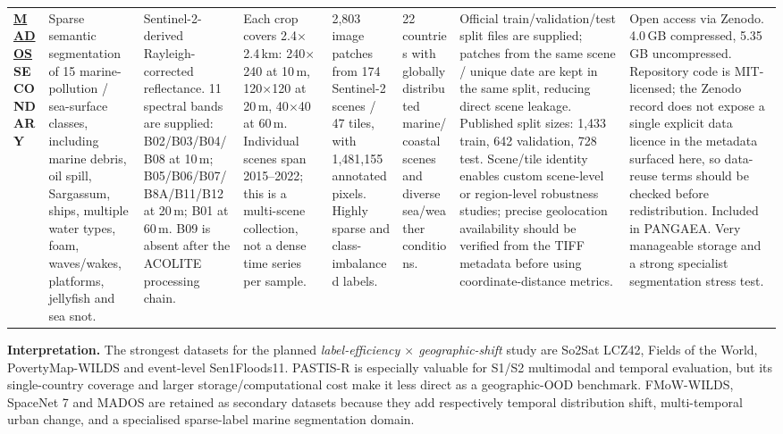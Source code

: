 \documentclass[11pt,a4paper]{article}
\begin{document}
\begin{landscape}
\begin{longtable}{
    Q{1.8cm}
    Q{2.5cm}
    Q{3.0cm}
    Q{2.5cm}
    Q{2.1cm}
    Q{3.0cm}
    Q{3.4cm}
    Q{3.4cm}
}
\href{https://zenodo.org/records/10664073}{\textbf{MADOS}}\newline
\textbf{SECONDARY}
&
Sparse semantic segmentation of 15 marine-pollution / sea-surface classes, including marine debris, oil spill, Sargassum, ships, multiple water types, foam, waves/wakes, platforms, jellyfish and sea snot.
&
Sentinel-2-derived Rayleigh-corrected reflectance. 11 spectral bands are supplied: B02/B03/B04/B08 at 10\,m; B05/B06/B07/B8A/B11/B12 at 20\,m; B01 at 60\,m. B09 is absent after the ACOLITE processing chain.
&
Each crop covers 2.4$\times$2.4\,km: 240$\times$240 at 10\,m, 120$\times$120 at 20\,m, 40$\times$40 at 60\,m. Individual scenes span 2015--2022; this is a multi-scene collection, not a dense time series per sample.
&
2,803 image patches from 174 Sentinel-2 scenes / 47 tiles, with 1,481,155 annotated pixels. Highly sparse and class-imbalanced labels.
&
22 countries with globally distributed marine/coastal scenes and diverse sea/weather conditions.
&
Official train/validation/test split files are supplied; patches from the same scene / unique date are kept in the same split, reducing direct scene leakage. Published split sizes: 1,433 train, 642 validation, 728 test. Scene/tile identity enables custom scene-level or region-level robustness studies; precise geolocation availability should be verified from the TIFF metadata before using coordinate-distance metrics.
&
Open access via Zenodo. 4.0\,GB compressed, 5.35\,GB uncompressed. Repository code is MIT-licensed; the Zenodo record does not expose a single explicit data licence in the metadata surfaced here, so data-reuse terms should be checked before redistribution. Included in PANGAEA. Very manageable storage and a strong specialist segmentation stress test.
\\

\end{longtable}

\vspace{0.5em}
\footnotesize
\noindent\textbf{Interpretation.}
The strongest datasets for the planned \emph{label-efficiency $\times$ geographic-shift} study are So2Sat LCZ42, Fields of the World, PovertyMap-WILDS and event-level Sen1Floods11. PASTIS-R is especially valuable for S1/S2 multimodal and temporal evaluation, but its single-country coverage and larger storage/computational cost make it less direct as a geographic-OOD benchmark. FMoW-WILDS, SpaceNet 7 and MADOS are retained as secondary datasets because they add respectively temporal distribution shift, multi-temporal urban change, and a specialised sparse-label marine segmentation domain.


\end{landscape}
\end{document}

